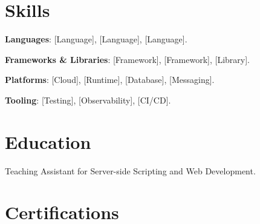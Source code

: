 \documentclass{resume}
\begin{document}
\section{Skills}
\begin{skillitems}
  \item \textbf{Languages}: [Language], [Language], [Language].
  \item \textbf{Frameworks \& Libraries}: [Framework], [Framework], [Library].
  \item \textbf{Platforms}: [Cloud], [Runtime], [Database], [Messaging].
  \item \textbf{Tooling}: [Testing], [Observability], [CI/CD].
\end{skillitems}

\section{Education}

\begin{jobduties}
  \item Teaching Assistant for Server-side Scripting and Web Development.
\end{jobduties}


\section{Certifications}

\end{document}
